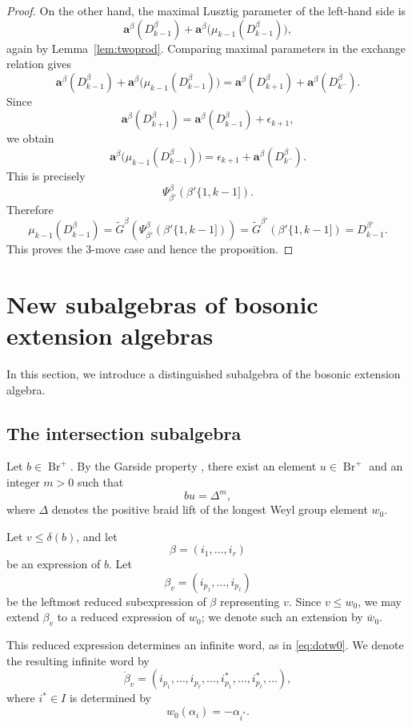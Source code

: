 \documentclass[12pt, reqno]{amsart}
\theoremstyle{plain}
\theoremstyle{definition}
\numberwithin{equation}{section}
\newcommand{\bfa}{\mathbf{a}}
\newcommand{\Br}{{\operatorname{Br}}}
\begin{document}
\begin{proof}
On the other hand, the maximal Lusztig parameter of the left-hand side is
\[
\bfa^\beta(D^\beta_{k-1})
+
\bfa^\beta\bigl(\mu_{k-1}(D^\beta_{k-1})\bigr),
\]
again by Lemma~\ref{lem:twoprod}. Comparing maximal parameters in the exchange
relation gives
\[
\bfa^\beta(D^\beta_{k-1})
+
\bfa^\beta\bigl(\mu_{k-1}(D^\beta_{k-1})\bigr)
=
\bfa^\beta(D^\beta_{k+1})
+
\bfa^\beta(D^\beta_{k^-}).
\]
Since
\[
\bfa^\beta(D^\beta_{k+1})
=
\bfa^\beta(D^\beta_{k-1})+\epsilon_{k+1},
\]
we obtain
\[
\bfa^\beta\bigl(\mu_{k-1}(D^\beta_{k-1})\bigr)
=
\epsilon_{k+1}+\bfa^\beta(D^\beta_{k^-}).
\]
This is precisely
\[
\Psi_{\beta'}^\beta(\beta'\{1,k-1]).
\]
Therefore
\[
\mu_{k-1}(D^\beta_{k-1})
=
\widetilde G^\beta\!\left(\Psi_{\beta'}^\beta(\beta'\{1,k-1])\right)
=
\widetilde G^{\beta'}(\beta'\{1,k-1])
=
D^{\beta'}_{k-1}.
\]
This proves the \(3\)-move case and hence the proposition.
\end{proof}


\section{ New subalgebras of bosonic extension algebras}
\label{sec:subalgebra}

In this section, we introduce a distinguished subalgebra of the bosonic
extension algebra.

\subsection{The intersection subalgebra}
\label{sec:algebracA}

Let \(b\in\Br^+\). By the Garside property \cite[Corollary~7.3]{oh2025pbw}, there exist an element
\(u\in\Br^+\) and an integer \(m>0\) such that
\begin{equation}\label{eq:Delta-factor}
    bu=\Delta^m,
\end{equation}
where \(\Delta\) denotes the positive braid lift of the longest Weyl group
element \(w_0\).

Let \(v\le \delta(b)\), and let
\[
\beta=(i_1,\dots,i_r)
\]
be an expression of \(b\). Let
\[
\beta_v=(i_{p_1},\dots,i_{p_\ell})
\]
be the leftmost reduced subexpression of \(\beta\) representing \(v\). Since
\(v\le w_0\), we may extend \(\beta_v\) to a reduced expression of \(w_0\);
we denote such an extension by \(\overline w_0\).

This reduced expression determines an infinite word, as in
\eqref{eq:dotw0}. We denote the resulting infinite word by
\begin{equation}
    \dot{\beta}_v
    =
    (i_{p_1},\dots,i_{p_\ell},\dots,
    i^*_{p_1},\dots,i^*_{p_\ell},\dots),
\end{equation}
where \(i^*\in I\) is determined by
\[
w_0(\alpha_i)=-\alpha_{i^*}.
\]
\end{document}
